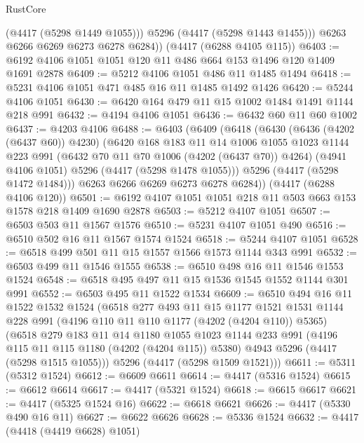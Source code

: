 \begin{lexlean}{RustCore}
\begin{coremodule}
            (@4417 (@5298 @1449 @1055)))
          @5296
          (@4417 (@5298 @1443 @1455)))
        @6263
        @6266
        @6269
        @6273
        @6278
        @6284))
    (@4417 (@6288 @4105 @115))
@6403 := @6192 @4106 @1051 @1051 @120 @11 @486 @664 @153 @1496 @120 @1409 @1691 @2878
@6409 := @5212 @4106 @1051 @486 @11 @1485 @1494
@6418 := @5231 @4106 @1051 @471 @485 @16 @11 @1485 @1492 @1426
@6420 := @5244 @4106 @1051
@6430 := @6420 @164 @479 @11 @15 @1002 @1484 @1491 @1144 @218 @991
@6432 := @4194 @4106 @1051
@6436 := @6432 @60 @11 @60 @1002
@6437 := @4203 @4106
@6488 := @6403
    (@6409
      (@6418
        (@6430
          (@6436 (@4202 (@6437 @60)) @4230)
          (@6420
            @168
            @183
            @11
            @14
            @1006
            @1055
            @1023
            @1144
            @223
            @991
            (@6432 @70 @11 @70 @1006 (@4202 (@6437 @70)) @4264)
            (@4941 @4106 @1051)
            @5296
            (@4417 (@5298 @1478 @1055)))
          @5296
          (@4417 (@5298 @1472 @1484)))
        @6263
        @6266
        @6269
        @6273
        @6278
        @6284))
    (@4417 (@6288 @4106 @120))
@6501 := @6192 @4107 @1051 @1051 @218 @11 @503 @663 @153 @1578 @218 @1409 @1690 @2878
@6503 := @5212 @4107 @1051
@6507 := @6503 @503 @11 @1567 @1576
@6510 := @5231 @4107 @1051 @490
@6516 := @6510 @502 @16 @11 @1567 @1574 @1524
@6518 := @5244 @4107 @1051
@6528 := @6518 @499 @501 @11 @15 @1557 @1566 @1573 @1144 @343 @991
@6532 := @6503 @499 @11 @1546 @1555
@6538 := @6510 @498 @16 @11 @1546 @1553 @1524
@6548 := @6518 @495 @497 @11 @15 @1536 @1545 @1552 @1144 @301 @991
@6552 := @6503 @495 @11 @1522 @1534
@6609 := @6510
    @494
    @16
    @11
    @1522
    @1532
    @1524
    (@6518
      @277
      @493
      @11
      @15
      @1177
      @1521
      @1531
      @1144
      @228
      @991
      (@4196 @110 @11 @110 @1177 (@4202 (@4204 @110)) @5365)
      (@6518
        @279
        @183
        @11
        @14
        @1180
        @1055
        @1023
        @1144
        @233
        @991
        (@4196 @115 @11 @115 @1180 (@4202 (@4204 @115)) @5380)
        @4943
        @5296
        (@4417 (@5298 @1515 @1055)))
      @5296
      (@4417 (@5298 @1509 @1521)))
@6611 := @5311 (@5312 @1524)
@6612 := @6609 @6611
@6614 := @4417 (@5316 @1524)
@6615 := @6612 @6614
@6617 := @4417 (@5321 @1524)
@6618 := @6615 @6617
@6621 := @4417 (@5325 @1524 @16)
@6622 := @6618 @6621
@6626 := @4417 (@5330 @490 @16 @11)
@6627 := @6622 @6626
@6628 := @5336 @1524
@6632 := @4417 (@4418 (@4419 @6628) @1051)

\end{coremodule}
\end{lexlean}
